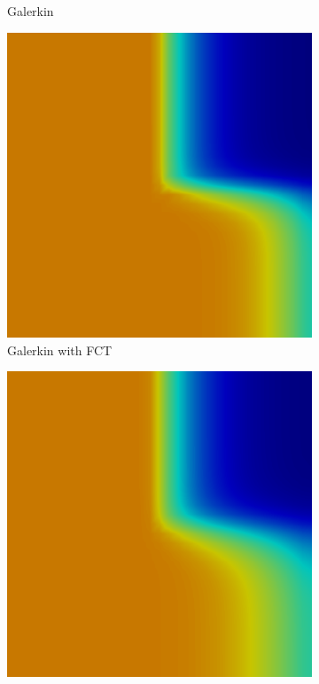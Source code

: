 \begin{figure}[h]
\begin{subfigure}{0.3\textwidth}
      \caption{Galerkin}
   \end{subfigure}
   \begin{subfigure}{0.3\textwidth}
      \includegraphics[width=\textwidth]{void_to_absorber/GalFCT.png}
      \caption{Galerkin with FCT}
   \end{subfigure}
   \begin{subfigure}{0.3\textwidth}
      \includegraphics[width=\textwidth]{void_to_absorber/low.png}

\end{subfigure}
\end{figure}
